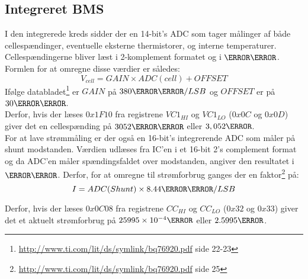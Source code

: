 
\subsection{Integreret BMS}
I den integrerede kreds sidder der en 14-bit's ADC som tager målinger af både cellespændinger, eventuelle eksterne thermistorer, og interne temperaturer. Cellespændingerne bliver læst i 2-komplement formatet og i $\milli\volt$. Formlen for at omregne disse værdier er således: 
\begin {equation} 
V_{cell} = GAIN \times ADC(cell) + OFFSET
\end {equation}
Ifølge databladet\footnote{\url{http://www.ti.com/lit/ds/symlink/bq76920.pdf} side 22-23} er $GAIN$ på $380\micro\volt/LSB$ og $OFFSET$ er på $30\milli\volt$. \\

Derfor, hvis der læses $0x1F10$ fra registrene $VC1_{HI}$ og $VC1_{LO}$ ($0x0C$ og $0x0D$) giver det en cellespænding på $3052\milli\volt$ eller $3,052\volt$.\\

For at lave strømmåling er der også en 16-bit's integrerende ADC som måler på shunt modstanden. Værdien udlæses fra IC'en i et 16-bit 2's complement format og da ADC'en måler spændingsfaldet over modstanden, angiver den resultatet i $\micro\volt$. Derfor, for at omregne til strømforbrug ganges der en faktor\footnote{\url{http://www.ti.com/lit/ds/symlink/bq76920.pdf} side 25} på: 
\begin {equation} 
I = ADC(Shunt) \times 8.44\micro\volt/LSB
\end {equation}

Derfor, hvis der læses $0x0C08$ fra registrene $CC_{HI}$ og $CC_{LO}$ ($0x32$ og $0x33$) giver det et aktuelt strømforbrug på $25995\times10^{-4}\ampere$ eller $2.5995\ampere$.